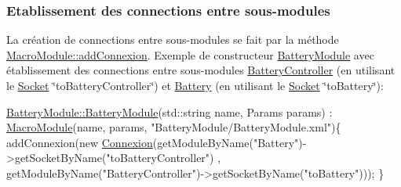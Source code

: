 \hypertarget{docMacroModule_connectSubModules}{}\subsubsection{Etablissement des connections entre sous-\/modules}\label{docMacroModule_connectSubModules}
La création de connections entre sous-\/modules se fait par la méthode \hyperlink{classMacroModule_a6ad4d6abd8bb4b742b800f6fa3c98296}{Macro\-Module\-::add\-Connexion}. Exemple de constructeur \hyperlink{classBatteryModule}{Battery\-Module} avec établissement des connections entre sous-\/modules \hyperlink{classBatteryController}{Battery\-Controller} (en utilisant le \hyperlink{classSocket}{Socket} \char`\"{}to\-Battery\-Controller\char`\"{}) et \hyperlink{classBattery}{Battery} (en utilisant le \hyperlink{classSocket}{Socket} \char`\"{}to\-Battery\char`\"{})\-: 
\begin{DoxyCode}
\hyperlink{classBatteryModule_a2fb494ef5f124c38c0fdf9ccfb31918f}{BatteryModule::BatteryModule}(std::string name, Params params) : 
      \hyperlink{classMacroModule}{MacroModule}(name, params, \textcolor{stringliteral}{"BatteryModule/BatteryModule.xml"})\{
     addConnexion(\textcolor{keyword}{new} \hyperlink{classConnexion}{Connexion}(getModuleByName(\textcolor{stringliteral}{"Battery"})->getSocketByName(\textcolor{stringliteral}{"toBatteryController"})
      , getModuleByName(\textcolor{stringliteral}{"BatteryController"})->getSocketByName(\textcolor{stringliteral}{"toBattery"})));
\}
\end{DoxyCode}
 